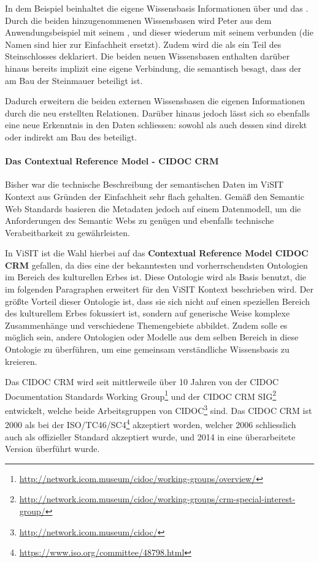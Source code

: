 In dem Beispiel beinhaltet die eigene Wissensbasis Informationen über  und das . Durch die beiden hinzugenommenen Wissensbasen wird Peter aus dem Anwendungsbeispiel mit seinem , und dieser wiederum mit seinem  verbunden (die Namen sind hier zur Einfachheit ersetzt). Zudem wird die  als ein Teil des Steinschlosses deklariert. Die beiden neuen Wissensbasen enthalten darüber hinaus bereits implizit eine eigene Verbindung, die semantisch besagt, dass der  am Bau der Steinmauer beteiligt ist.

Dadurch erweitern die beiden externen Wissensbasen die eigenen Informationen durch die neu erstellten Relationen. Darüber hinaus jedoch lässt sich so ebenfalls eine neue Erkenntnis in den Daten schliessen: sowohl  als auch dessen  sind direkt oder indirekt am Bau des  beteiligt.

\paragraph{Das Contextual Reference Model - CIDOC CRM}

Bisher war die technische Beschreibung der semantischen Daten im ViSIT Kontext aus Gründen der Einfachheit sehr flach gehalten. Gemäß den Semantic Web Standards basieren die Metadaten jedoch auf einem Datenmodell, um die Anforderungen des Semantic Webs zu genügen und ebenfalls technische Verabeitbarkeit zu gewährleisten.

In ViSIT ist die Wahl hierbei auf das \textbf{Contextual Reference Model CIDOC CRM} \cite{CIDOC-Doerr-2003} gefallen, da dies eine der bekanntesten und vorherrschendsten Ontologien im Bereich des kulturellen Erbes ist. Diese Ontologie wird als Basis benutzt, die im folgenden Paragraphen erweitert für den ViSIT Kontext beschrieben wird. Der größte Vorteil dieser Ontologie ist, dass sie sich nicht auf einen speziellen Bereich des kulturellem Erbes fokussiert ist, sondern auf generische Weise komplexe Zusammenhänge und verschiedene Themengebiete abbildet. Zudem solle es möglich sein, andere Ontologien oder Modelle aus dem selben Bereich in diese Ontologie zu überführen, um eine gemeinsam verständliche Wissensbasis zu kreieren.

Das CIDOC CRM wird seit mittlerweile über 10 Jahren von der CIDOC Documentation Standards Working Group\footnote{\url{http://network.icom.museum/cidoc/working-groups/overview/}} und der CIDOC CRM SIG\footnote{\url{http://network.icom.museum/cidoc/working-groups/crm-special-interest-group/}} entwickelt, welche beide Arbeitsgruppen von CIDOC\footnote{\url{http://network.icom.museum/cidoc/}} sind. Das CIDOC CRM ist 2000 als  bei der ISO/TC46/SC4\footnote{\url{https://www.iso.org/committee/48798.html}} akzeptiert worden, welcher 2006 schliesslich auch als offizieller Standard \cite{CIDOCCRM-iso21127:2006} akzeptiert wurde, und 2014 in eine überarbeitete Version \cite{CIDOCCRM-iso21127:2014} überführt wurde.

